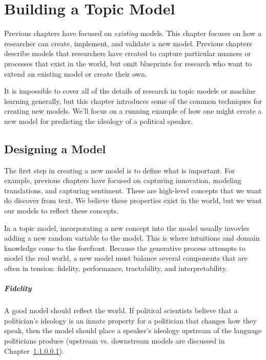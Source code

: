 

\chapter{Building a Topic Model}
\label{ch:building}

Previous chapters have focused on \emph{existing} models.  This
chapter focuses on how a researcher can create, implement, and
validate a new model.  Previous chapters describe
models that researchers have created to capture particular nuances or
processes that exist in the world, but omit blueprints
for research who want to extend an existing model or create their own.

It is impossible to cover all of the details of research in topic
models or machine learning generally, but this chapter introduces some
of the common techniques for creating new models.  We'll focus on a
running example of how one might create a new model for predicting the
ideology of a political speaker.

\section{Designing a Model}

The first step in creating a new model is to define what is
important.  For example, previous chapters have focused on capturing
innovation, modeling translations, and capturing sentiment.  These are
high-level concepts that we want do discover from text.  We believe
these properties exist in the world, but we want our models to reflect
these concepts.

In a topic model, incorporating a new concept into the model usually
invovles adding a new random variable to the model.  This is where
intuitions and domain knowledge come to the forefront.  Because the
generative process attempts to model the real world, a new model must
balance several components that are often in tension: fidelity,
performance, tractability, and interpretability.

\paragraph{Fidelity}

A good model should reflect the world.  If political scientists
believe that a politician's ideology is an innate property for a
politician that changes how they speak, then the model should place a
speaker's ideology upstream of the language politicians produce
(upstream vs. downstream models are discussed in Chapter~\ref{}).

